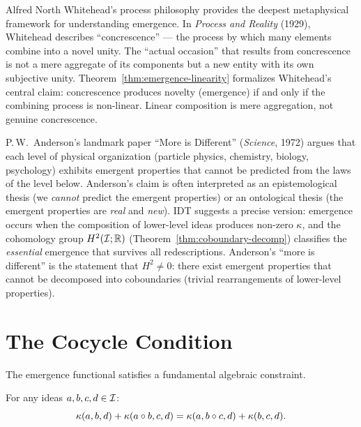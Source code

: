 \begin{interpretation}
\label{interp:ch19:whitehead_anderson}
Alfred North Whitehead's process philosophy provides the deepest
metaphysical framework for understanding emergence.  In \textit{Process
and Reality} (1929), Whitehead describes ``concrescence'' --- the process
by which many elements combine into a novel unity.  The ``actual occasion''
that results from concrescence is not a mere aggregate of its components
but a new entity with its own subjective unity.  Theorem~\ref{thm:emergence-linearity}
formalizes Whitehead's central claim: concrescence produces novelty
(emergence) if and only if the combining process is non-linear.  Linear
composition is mere aggregation, not genuine concrescence.

P.\,W.\ Anderson's landmark paper ``More is Different'' (\textit{Science},
1972) argues that each level of physical organization (particle physics,
chemistry, biology, psychology) exhibits emergent properties that cannot
be predicted from the laws of the level below.  Anderson's claim is often
interpreted as an epistemological thesis (we \emph{cannot} predict the
emergent properties) or an ontological thesis (the emergent properties
are \emph{real} and \emph{new}).  IDT suggests a precise version:
emergence occurs when the composition of lower-level ideas produces
non-zero $\kappa$, and the cohomology group $H^2(\mathcal{I}; \mathbb{R})$
(Theorem~\ref{thm:coboundary-decomp}) classifies the \emph{essential}
emergence that survives all redescriptions.  Anderson's ``more is
different'' is the statement that $H^2 \neq 0$: there exist emergent
properties that cannot be decomposed into coboundaries (trivial
rearrangements of lower-level properties).
\end{interpretation}

\section{The Cocycle Condition}

The emergence functional satisfies a fundamental algebraic constraint.

\begin{theorem}
\label{thm:cocycle}
For any ideas $a, b, c, d \in \mathcal{I}$:
\[
  \kappa(a, b, d) + \kappa(a \circ b, c, d)
  = \kappa(a, b \circ c, d) + \kappa(b, c, d).
\]
\end{theorem}

